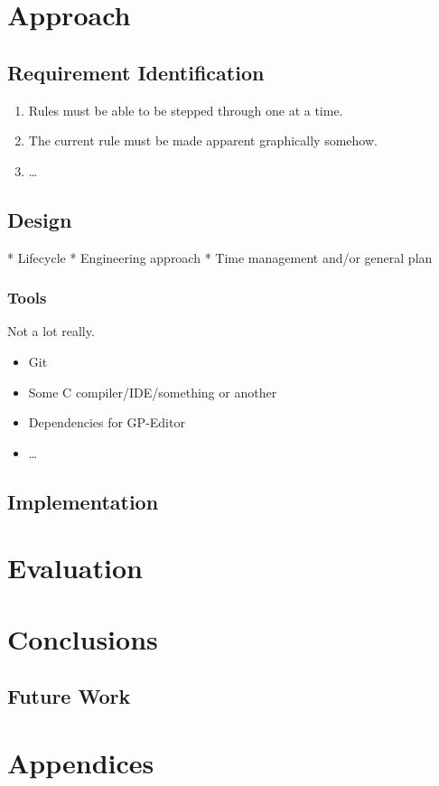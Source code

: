 \documentclass{UoYCSproject}
\begin{document}




\chapter{Approach}
\section{Requirement Identification}
\begin{enumerate}
	\item Rules must be able to be stepped through one at a time.
 	\item The current rule must be made apparent graphically somehow.
	\item \ldots
\end{enumerate}
\section{Design}
 * Lifecycle
 * Engineering approach
 * Time management and/or general plan
 
\subsection{Tools}
Not a lot really.
\begin{itemize}
  \item Git
  \item Some C compiler/IDE/something or another
  \item Dependencies for GP-Editor
  \item \ldots
\end{itemize}
\section{Implementation}

\chapter{Evaluation}
\chapter{Conclusions}
\section{Future Work}

% 

\chapter{Appendices}
\end{document}

